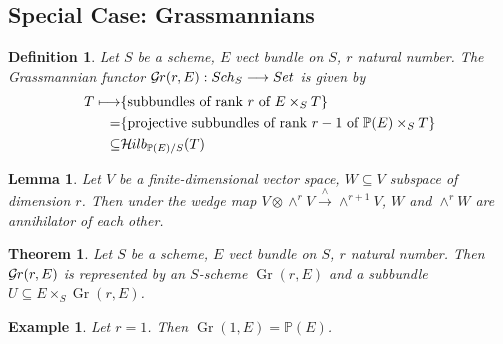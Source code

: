 \documentclass{ctexart}
\newtheorem{definition}{Definition}[section]
\newtheorem{theorem}{Theorem}[section]
\newtheorem{lemma}{Lemma}[section]
\newtheorem{example}{Example}[section]
\newcommand{\grassmannianscheme}[2]{\operatorname{Gr}(#1, #2)}
\newcommand{\grassmanmianfunctor}[2]{\mathcal{G}\kern -.5pt r(#1, #2)}
\newcommand{\hilbertfunctor}{\mathcal{H}\kern -.5pt ilb}
\begin{document}
\subsection{Special Case: Grassmannians}
\label{subsection:Special Case: Grassmannians}
\begin{definition}
    Let $S$ be a scheme, $E$ vect bundle on $S$, $r$ natural number.
    The Grassmannian functor $\grassmanmianfunctor{r}{E}: Sch_{S} \longrightarrow Set$ is given by 
    \begin{equation*}
        \begin{split}
            T \longmapsto & \{\text{subbundles of rank $r$ of $E \times_{S} T$}\} \\
            = & \{\text{projective subbundles of rank $r - 1$ of $\mathbb{P}(E) \times_{S} T$}\} \\
            \subseteq & \hilbertfunctor_{\mathbb{P}(E)/S}(T) 
        \end{split}
    \end{equation*}
\end{definition}
\begin{lemma}
    Let $V$ be a finite-dimensional vector space, $W \subseteq V$ subspace of dimension $r$.
    Then under the wedge map $V \otimes \wedge^{r} V \overset{\wedge}{\longrightarrow} \wedge^{r + 1} V$,
    $W$ and $\wedge^{r} W$ are annihilator of each other.
    \label{Lemma 13.1}
\end{lemma}
\begin{theorem}
    Let $S$ be a scheme, $E$ vect bundle on $S$, $r$ natural number.
    Then $\grassmanmianfunctor{r}{E}$ is represented by an $S$-scheme $\grassmannianscheme{r}{E}$ and a subbundle $U \subseteq E \times_{S} \grassmannianscheme{r}{E}$.
    \label{Theorem 13.2}
\end{theorem}
\begin{example}
    Let $r = 1$.
    Then $\grassmannianscheme{1}{E} = \mathbb{P}(E)$.
\end{example}
\end{document}
